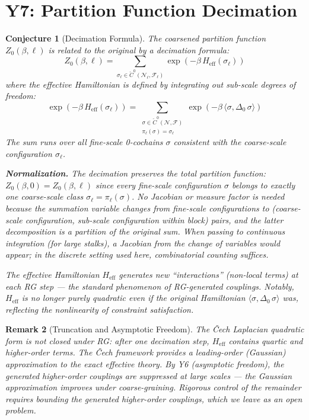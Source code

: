 \documentclass[11pt,letterpaper]{article}
\newtheorem{conjecture}{Conjecture}[section]
\newtheorem{remark}[conjecture]{Remark}
\newcommand{\Cech}{\check{C}}
\newcommand{\sheaf}{\mathcal{F}}
\newcommand{\nerve}{\mathcal{N}}
\begin{document}
\section{Y7: Partition Function Decimation}

\begin{conjecture}[Decimation 
Formula]\label{conj:decimation}
The coarsened partition function $Z_0(\beta, \ell)$ is related to 
the original by a \emph{decimation formula}:
\begin{equation}\label{eq:decimation}
    Z_0(\beta, \ell) = \sum_{\sigma_\ell \in 
    \Cech^0(\nerve_\ell, \sheaf_\ell)} 
    \exp(-\beta \, H_{\mathrm{eff}}(\sigma_\ell))
\end{equation}
where the effective Hamiltonian is defined by integrating out 
sub-scale degrees of freedom:
\begin{equation}\label{eq:heff}
    \exp(-\beta \, H_{\mathrm{eff}}(\sigma_\ell)) 
    = \sum_{\substack{\sigma \in \Cech^0(\nerve, \sheaf) \\ 
    \pi_\ell(\sigma) = \sigma_\ell}} 
    \exp(-\beta \, \langle \sigma, \Delta_0 \, \sigma \rangle)
\end{equation}
The sum runs over all fine-scale 0-cochains $\sigma$ consistent 
with the coarse-scale configuration $\sigma_\ell$.

\textbf{Normalization.} The decimation preserves the total partition 
function: $Z_0(\beta, 0) = Z_0(\beta, \ell)$ since every fine-scale 
configuration $\sigma$ belongs to exactly one coarse-scale class 
$\sigma_\ell = \pi_\ell(\sigma)$. No Jacobian or measure factor is 
needed because the summation variable changes from fine-scale 
configurations to (coarse-scale configuration, sub-scale 
configuration within block) pairs, and the latter decomposition is 
a partition of the original sum. When passing to continuous 
integration (for large stalks), a Jacobian from the change of 
variables would appear; in the discrete setting used here, 
combinatorial counting suffices.

The effective Hamiltonian $H_{\mathrm{eff}}$ generates new 
``interactions'' (non-local terms) at each RG step --- the standard 
phenomenon of RG-generated couplings. Notably, $H_{\mathrm{eff}}$ 
is no longer purely quadratic even if the original Hamiltonian 
$\langle \sigma, \Delta_0 \, \sigma \rangle$ was, reflecting the 
nonlinearity of constraint satisfaction.
\end{conjecture}

\begin{remark}[Truncation and Asymptotic 
Freedom]\label{rem:truncation}
The \v{C}ech Laplacian quadratic form is not closed under RG: after 
one decimation step, $H_{\mathrm{eff}}$ contains quartic and 
higher-order terms. The \v{C}ech framework provides a 
\emph{leading-order (Gaussian) approximation} to the exact effective 
theory. By Y6 (asymptotic freedom), the generated higher-order 
couplings are suppressed at large scales --- the Gaussian 
approximation improves under coarse-graining. Rigorous control of 
the remainder requires bounding the generated higher-order 
couplings, which we leave as an open problem.
\end{remark}
\end{document}
